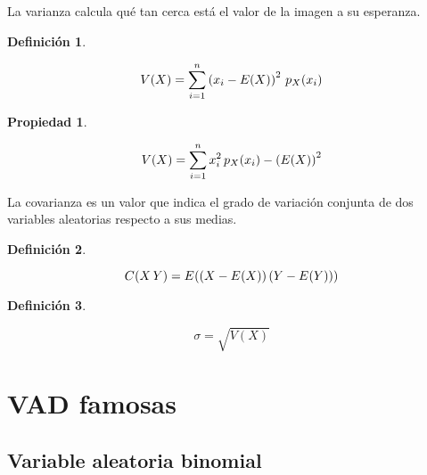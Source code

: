\documentclass[a5paper,12pt,twoside]{book}
\newtheorem{defn}{{Definición}}[chapter]
\newtheorem{prop}{{Propiedad}}[chapter]
\begin{document}
La varianza calcula qué tan cerca está el valor de la imagen a su esperanza.

\begin{mdframed}[style=MyFrame1]
    \begin{defn}
    \end{defn}
    \begin{equation*}
        V(X) = \sum_{i=1}^n \bb{x_i - E(X)}^2 \, p_X(x_i)
    \end{equation*}
\end{mdframed}

\begin{mdframed}[style=MyFrame1]
    \begin{prop}
    \end{prop}
    \begin{equation*}
        V(X) = \sum_{i=1}^n x_i^2 \, p_X(x_i) - \bb{E(X)}^2
    \end{equation*}
\end{mdframed}

La covarianza es un valor que indica el grado de variación conjunta de dos variables aleatorias respecto a sus medias.

\begin{mdframed}[style=MyFrame1]
    \begin{defn}
    \end{defn}
    \begin{equation*}
        \fx[C]{X\,Y} = \fx[E]{\bb{X-\fx[E]{X}} \bb{Y-\fx[E]{Y}}}
    \end{equation*}
\end{mdframed}

\begin{mdframed}[style=MyFrame1]
    \begin{defn}
    \end{defn}
    \begin{equation*}
        \sigma = \sqrt{V(X)}
    \end{equation*}
\end{mdframed}


\section{VAD famosas}


\subsection{Variable aleatoria binomial}
\end{document}

